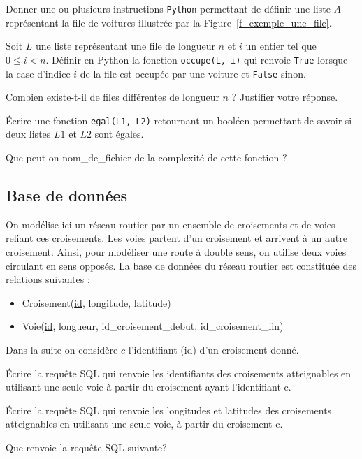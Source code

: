 \question{} Donner une ou plusieurs instructions \lstinline{Python} permettant de définir une liste $A$ représentant la file de voitures illustrée par la Figure~\ref{f_exemple_une_file}.

\question{} Soit $L$ une liste représentant une file de longueur $n$ et $i$ un entier tel que $0\leqslant i < n$.
Définir en Python la fonction \lstinline{occupe(L, i)} qui renvoie \lstinline{True} lorsque la case d'indice $i$ de la file
est occupée par une voiture et \lstinline{False} sinon.

\question{} Combien existe-t-il de files différentes de longueur $n$ ? Justifier votre réponse.

\question{} \'Ecrire une fonction \lstinline{egal(L1, L2)} retournant un booléen permettant de savoir si deux listes $L1$ et $L2$ sont égales.

\question{} Que peut-on nom\_de\_fichier de la complexité de cette fonction ?


\subsection{ Base de données}

On modélise ici un réseau routier par un ensemble de croisements et de voies reliant ces croisements.
Les voies partent d'un croisement et arrivent à un autre croisement. Ainsi, pour modéliser une route
à double sens, on utilise deux voies circulant en sens opposés.
La base de données du réseau routier est constituée des relations suivantes :
\begin{itemize}
	\item[\textbullet]  Croisement(\underline{id}, longitude, latitude)
    \item[\textbullet] Voie(\underline{id}, longueur, id\_croisement\_debut, id\_croisement\_fin)
\end{itemize}

Dans la suite on considère $c$ l'identifiant (id) d'un croisement donné.

\question{} \' Ecrire la requête SQL qui renvoie les identifiants des croisements atteignables en utilisant une seule voie à partir du croisement ayant l'identifiant c.

\question{} \'Ecrire la requête SQL qui renvoie les longitudes et latitudes des croisements atteignables en utilisant une seule voie, à partir du croisement c.

\question{} Que renvoie la requête SQL suivante?

% 

